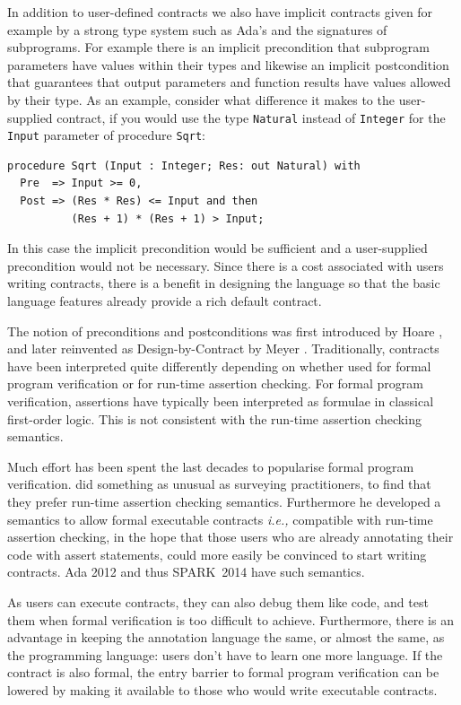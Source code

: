\documentclass[sttt,final]{svjour}
\newcommand{\newspark}{SPARK~2014\xspace}
\newcommand{\ie}{\textit{i.e.,}\xspace}
\begin{document}
In addition to user-defined contracts we also have implicit contracts
given for example by a strong type system such as Ada's and the
signatures of subprograms. For example there is an implicit
precondition that subprogram parameters have values within their types
and likewise an implicit postcondition that guarantees that output
parameters and function results have values allowed by their type. As
an example, consider what difference it makes to the user-supplied
contract, if you would use the type \verb|Natural| instead of
\verb|Integer| for the \verb|Input| parameter of procedure \verb|Sqrt|:

\begin{lstlisting}
procedure Sqrt (Input : Integer; Res: out Natural) with
  Pre  => Input >= 0,
  Post => (Res * Res) <= Input and then
          (Res + 1) * (Res + 1) > Input;
\end{lstlisting}

In this case the implicit precondition would be sufficient and a
user-supplied precondition would not be necessary. Since there is a
cost associated with users writing contracts, there is a benefit in
designing the language so that the basic language features already
provide a rich default contract.

The notion of preconditions and postconditions was first introduced by Hoare
\cite{hoare69cacm}, and later reinvented as Design-by-Contract by Meyer
\cite{meyer:1988:OSC}. Traditionally, contracts have been interpreted quite
differently depending on whether used for formal program verification or for
run-time assertion checking. For formal program verification, assertions have
typically been interpreted as formulae in classical first-order logic. This is
not consistent with the run-time assertion checking semantics.

Much effort has been spent the last decades to popularise formal
program verification. \cite{tseChalin10} did something as unusual as
surveying practitioners, to find that they prefer run-time assertion
checking semantics. Furthermore he developed a semantics to allow
formal executable contracts \ie compatible with run-time assertion
checking, in the hope that those users who are already annotating
their code with assert statements, could more easily be convinced to
start writing contracts. Ada 2012 and thus \newspark have such
semantics.

As users can execute contracts, they can also debug them like code, and test
them when formal verification is too difficult to achieve.
Furthermore, there is an advantage in keeping the annotation language
the same, or almost the same, as the programming language: users
don't have to learn one more language. If the contract is also formal,
the entry barrier to formal program verification can be lowered by
making it available to those who would write executable contracts.
\end{document}
